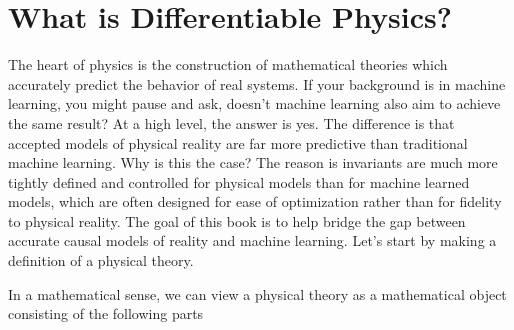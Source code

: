 \documentclass[book.tex]{subfiles}
\begin{document}
\chapter{What is Differentiable Physics?}
\label{ch:intro} 
The heart of physics is the construction of mathematical theories which accurately predict the behavior of real systems. If your background is in machine learning, you might pause and ask, doesn't machine learning also aim to achieve the same result? At a high level, the answer is yes. The difference is that accepted models of physical reality are far more predictive than traditional machine learning. Why is this the case? The reason is invariants are much more tightly defined and controlled for physical models than for machine learned models, which are often designed for ease of optimization rather than for fidelity to physical reality. The goal of this book is to help bridge the gap between accurate causal models of reality and machine learning. Let's start by making a definition of a physical theory.

In a mathematical sense, we can view a physical theory as a mathematical object consisting of the following parts
\end{document}
